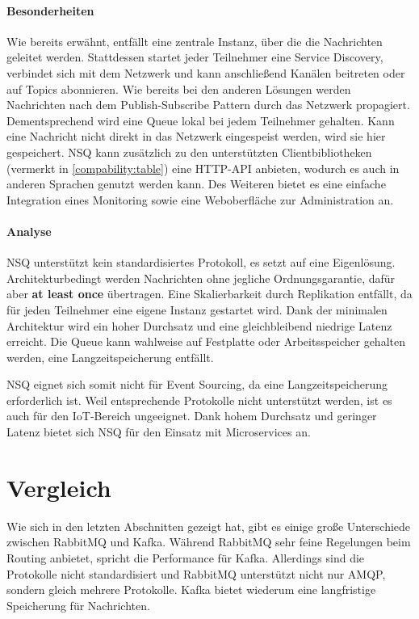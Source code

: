 \paragraph{Besonderheiten}
Wie bereits erwähnt, entfällt eine zentrale Instanz, über die die Nachrichten
geleitet werden. Stattdessen startet jeder Teilnehmer eine Service Discovery,
verbindet sich mit dem Netzwerk und kann anschließend Kanälen beitreten
oder auf Topics abonnieren. Wie bereits bei den anderen Lösungen werden
Nachrichten nach dem Publish-Subscribe Pattern durch das Netzwerk propagiert.
Dementsprechend wird eine Queue lokal bei jedem Teilnehmer gehalten.
Kann eine Nachricht nicht direkt in das Netzwerk eingespeist werden, wird
sie hier gespeichert.
NSQ kann zusätzlich zu den unterstützten Clientbibliotheken (vermerkt in
\ref{compability:table}) eine HTTP-API anbieten, wodurch es auch in anderen
Sprachen genutzt werden kann. Des Weiteren bietet es eine einfache Integration
eines Monitoring sowie eine Weboberfläche zur Administration an. \cite{NSQ:online}
\paragraph{Analyse}
NSQ unterstützt kein standardisiertes Protokoll, es setzt auf eine
Eigenlösung. Architekturbedingt werden Nachrichten ohne jegliche
Ordnungsgarantie, dafür aber \textbf{at least once} übertragen. Eine Skalierbarkeit
durch Replikation entfällt, da für jeden Teilnehmer eine eigene Instanz
gestartet wird. Dank der minimalen Architektur wird ein hoher Durchsatz
und eine gleichbleibend niedrige Latenz erreicht. Die Queue kann wahlweise
auf Festplatte oder Arbeitsspeicher gehalten werden, eine Langzeitspeicherung
entfällt. \cite{NSQ:online}

NSQ eignet sich somit nicht für Event Sourcing, da eine Langzeitspeicherung
erforderlich ist. Weil entsprechende Protokolle nicht unterstützt werden, ist es
auch für den IoT-Bereich ungeeignet. Dank hohem Durchsatz und geringer
Latenz bietet sich NSQ für den Einsatz mit Microservices an.
\section{Vergleich}
Wie sich in den letzten Abschnitten gezeigt hat, gibt es einige große
Unterschiede zwischen RabbitMQ und Kafka.
Während RabbitMQ sehr feine Regelungen beim Routing anbietet, spricht die
Performance für Kafka. Allerdings sind die Protokolle nicht standardisiert und
RabbitMQ unterstützt nicht nur AMQP, sondern gleich mehrere Protokolle.
Kafka bietet wiederum eine langfristige Speicherung für Nachrichten.

